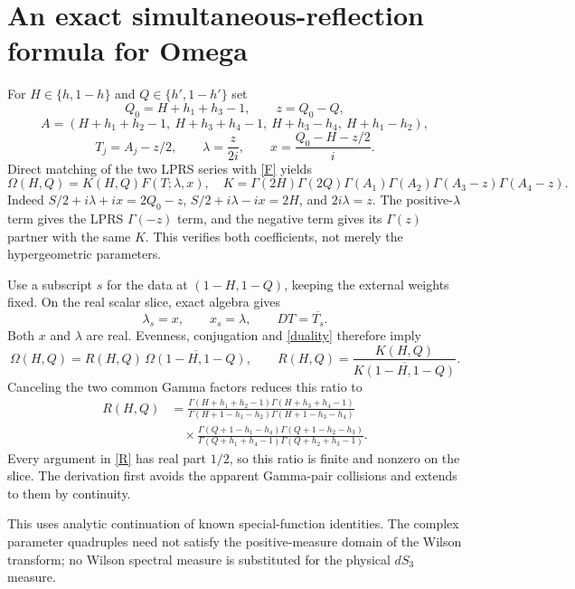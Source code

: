 \documentclass[11pt,a4paper]{article}
\newcommand{\Om}{\Omega}
\begin{document}
\newpage
\section{An exact simultaneous-reflection formula for Omega}
For $H\in\{h,1-h\}$ and $Q\in\{h',1-h'\}$ set
\[
 Q_0=H+h_1+h_3-1,\qquad z=Q_0-Q,
\]
\[
 A=(H+h_1+h_2-1,\ H+h_3+h_4-1,\ H+h_3-h_4,\ H+h_1-h_2),
\]
\[
 T_j=A_j-z/2,\qquad \lambda=\frac{z}{2i},\qquad
 x=\frac{Q_0-H-z/2}{i}.
\]
Direct matching of the two LPRS series \cite{lprs} with \eqref{F} yields
\begin{equation}
 \Om(H,Q)=K(H,Q)F(T;\lambda,x),
 \quad
 K=\Gamma(2H)\Gamma(2Q)\Gamma(A_1)\Gamma(A_2)
                    \Gamma(A_3-z)\Gamma(A_4-z).
 \label{dictionary}
\end{equation}
Indeed $S/2+i\lambda+ix=2Q_0-z$,
$S/2+i\lambda-ix=2H$, and $2i\lambda=z$.
The positive-$\lambda$ term gives the LPRS $\Gamma(-z)$ term,
and the negative term gives its $\Gamma(z)$ partner with the same $K$.
This verifies both coefficients, not merely the hypergeometric parameters.

Use a subscript $s$ for the data at $(1-H,1-Q)$, keeping the external
weights fixed. On the real scalar slice, exact algebra gives
\[
 \lambda_s=x,\qquad x_s=\lambda,\qquad DT=\overline{T_s}.
\]
Both $x$ and $\lambda$ are real. Evenness, conjugation and \eqref{duality}
therefore imply
\begin{equation}
 \boxed{\Om(H,Q)=R(H,Q)\,
             \overline{\Om(1-H,1-Q)}} ,
 \qquad R(H,Q)=\frac{K(H,Q)}{\overline{K(1-H,1-Q)}} .
 \label{reflection}
\end{equation}
Canceling the two common Gamma factors reduces this ratio to
\begin{align}
 R(H,Q)
 &=\frac{\Gamma(H+h_1+h_2-1)\Gamma(H+h_3+h_4-1)}
 {\Gamma(H+1-h_1-h_2)\Gamma(H+1-h_3-h_4)}
 \nonumber\\
 &\quad\times
 \frac{\Gamma(Q+1-h_1-h_4)\Gamma(Q+1-h_2-h_3)}
 {\Gamma(Q+h_1+h_4-1)\Gamma(Q+h_2+h_3-1)} .
 \label{R}
\end{align}
Every argument in \eqref{R} has real part $1/2$, so this ratio is finite
and nonzero on the slice. The derivation first avoids the apparent
Gamma-pair collisions and extends to them by continuity.

This uses analytic continuation of known special-function identities.
The complex parameter quadruples need not satisfy the positive-measure
domain of the Wilson transform; no Wilson spectral measure is substituted
for the physical $dS_3$ measure.
\end{document}
